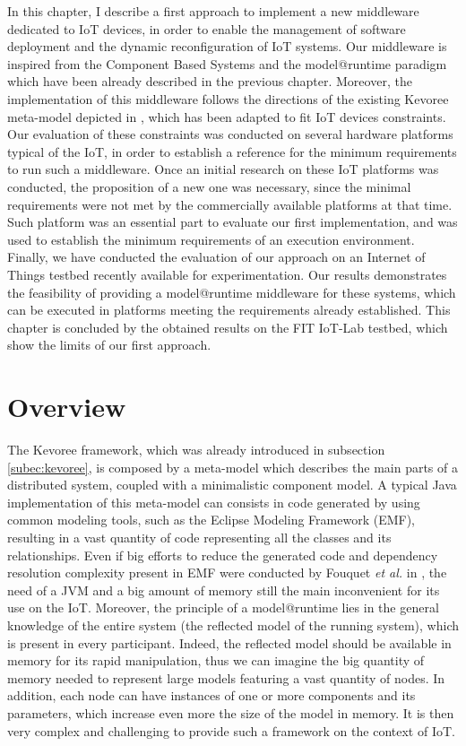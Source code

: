 In this chapter, I describe a first approach to implement a new middleware dedicated to IoT devices, in order to enable the management of software deployment and the dynamic reconfiguration of IoT systems.
Our middleware is inspired from the Component Based Systems and the model@runtime paradigm which have been already described in the previous chapter.
Moreover, the implementation of this middleware follows the directions of the existing Kevoree meta-model depicted in , which has been adapted to fit IoT devices constraints. 
Our evaluation of these constraints was conducted on several hardware platforms typical of the IoT, in order to establish a reference for the minimum requirements to run such a middleware.
Once an initial research on these IoT platforms was conducted, the proposition of a new one was necessary, since the minimal requirements were not met by the commercially available platforms at that time.
Such platform was an essential part to evaluate our first implementation, and was used to establish the minimum requirements of an execution environment.
Finally, we have conducted the evaluation of our approach on an Internet of Things testbed\cite{Fleury15iotlab} recently available for experimentation.
Our results demonstrates the feasibility of providing a model@runtime middleware for these systems, which can be executed in platforms meeting the requirements already established.
This chapter is concluded by the obtained results on the FIT IoT-Lab testbed, which show the limits of our first approach.

\section{Overview}
\label{sec:MAR_overview}
The Kevoree framework, which was already introduced in subsection \ref{subec:kevoree}, is composed by a meta-model which describes the main parts of a distributed system, coupled with a minimalistic component model.
A typical Java implementation of this meta-model can consists in code generated by using common modeling tools, such as the Eclipse Modeling Framework (EMF)\cite{steinberg2008emf}, resulting in a vast quantity of code representing all the classes and its relationships.
Even if big efforts to reduce the generated code and dependency resolution complexity present in EMF were conducted by Fouquet \textit{et al.} in \cite{fouquet2012eclipse}, the need of a JVM and a big amount of memory still the main inconvenient for its use on the IoT.
Moreover, the principle of a model@runtime lies in the general knowledge of the entire system (the reflected model of the running system), which is present in every participant.
Indeed, the reflected model should be available in memory for its rapid manipulation, thus we can imagine the big quantity of memory needed to represent large models featuring a vast quantity of nodes.
In addition, each node can have instances of one or more components and its parameters, which increase even more the size of the model in memory.
It is then very complex and challenging to provide such a framework on the context of IoT.

